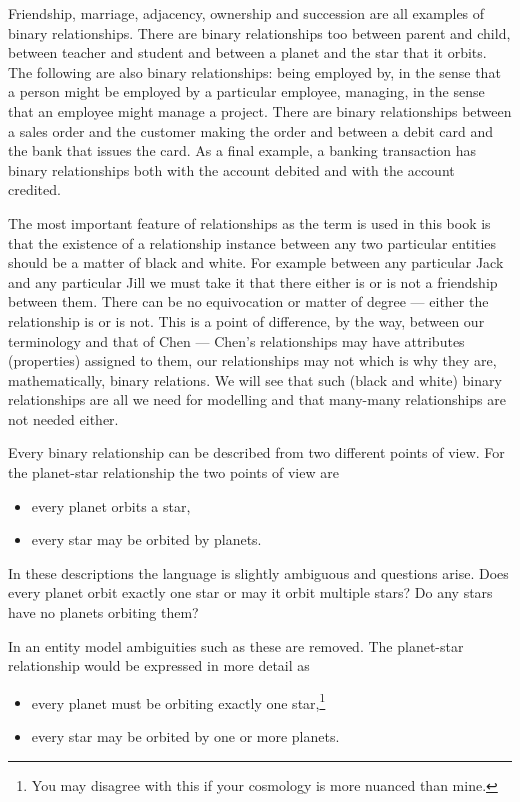 \mynote
Friendship,  marriage, adjacency, ownership and succession are all examples of binary relationships. There are binary relationships too  between parent and child, between teacher and student and between a planet and the star that it orbits.   
The following are also binary relationships:
being employed by, in the sense that a person might be employed by a particular employee,
managing, in the sense that an employee might manage a project. 
There are binary relationships between a sales order and the customer making the order and between a debit card and  the bank that issues the card. As a final example, a banking transaction has binary relationships both with the account debited and with the account credited. 

\mynote The most important feature of relationships as the term is used  in this book is that the existence of a relationship instance between any two particular entities should be a matter of black and white. For example between any particular Jack and any particular Jill we must take it that there either is or is not a friendship between them. There can be no equivocation or matter of degree --- either the relationship is or is not. This is a point of difference, by the way, between our terminology and that of Chen --- Chen's relationships may have attributes (properties) assigned to them, our relationships may not which is why they are, mathematically, binary relations. We will see that such (black and white) binary relationships are all we need for modelling and that many-many relationships are not needed either. 

\mynote 
Every binary relationship can be described from two different points of view. 
For the planet-star relationship the two points of view are
\begin{itemize}
\item every planet orbits a star,
\item every star may be orbited by planets.
\end{itemize}

In these descriptions the language is slightly ambiguous and questions arise.
Does every planet orbit exactly one star or may it orbit multiple stars? Do any stars have no planets orbiting them?

In an entity model ambiguities such as these are removed. 
The planet-star relationship would be expressed in more detail as
\begin{itemize}
\item every planet must be orbiting exactly one star,\footnote{You may disagree with this if your cosmology is more nuanced than mine.}
\item every star may be orbited by one or more planets.
\end{itemize}

